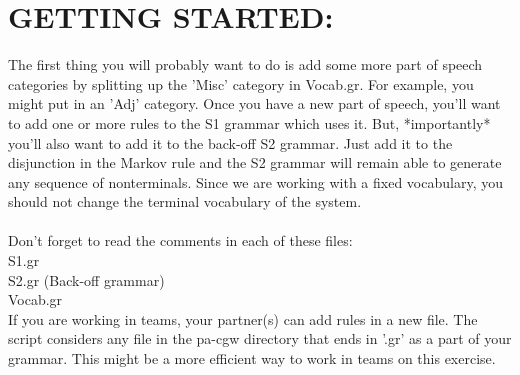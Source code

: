 \documentclass[11pt]{article}
\begin{document}
\section{GETTING STARTED:}
The first thing you will probably want to do is add some more part of speech categories by splitting up the 'Misc' category in Vocab.gr.  For example, you might put in an 'Adj' category.  Once you have a new part of speech, you'll want to add one or more rules to the S1 grammar which uses it.  But, *importantly* you'll also want to add it to the back-off S2 grammar.  Just add it to the disjunction in the Markov rule and the S2 grammar will remain able to generate any sequence of nonterminals. Since we are working with a fixed vocabulary, you should not change the terminal vocabulary of the system.\\ \\
Don't forget to read the comments in each of these files:\\
S1.gr \\
S2.gr (Back-off grammar) \\
Vocab.gr \\

If you are working in teams, your partner(s) can add rules in a new file. The script considers any file in the pa-cgw directory that ends in  '.gr' as a part of your grammar. This might be a more efficient way to work in teams on this exercise.
\end{document}
